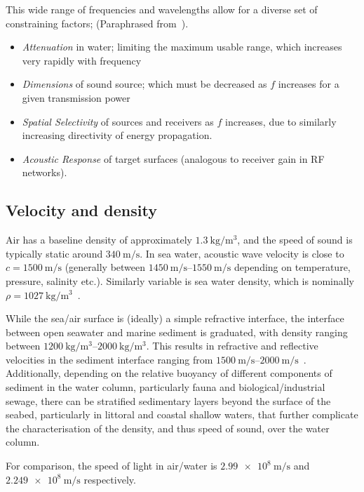 This wide range of frequencies and wavelengths allow for a diverse set of constraining factors; (Paraphrased from~\citet{lurton2010}).

\begin{itemize}
  \item \emph{Attenuation} in water; limiting the maximum usable range, which increases very rapidly with frequency
  \item \emph{Dimensions} of sound source; which must be decreased as $f$ increases for a given transmission power
  \item \emph{Spatial Selectivity} of sources and receivers as $f$ increases, due to similarly increasing directivity of energy propagation.
  \item \emph{Acoustic Response} of target surfaces (analogous to receiver gain in RF networks).
\end{itemize}

\subsection{Velocity and density}\label{sec:aco_vel}

Air has a baseline density of approximately $\SI{1.3}{\kilogram\per\meter\cubed}$, and the speed of sound is typically static around $\SI{340}{\meter\per\second}$.
In sea water, acoustic wave velocity is close to $c=\SI{1500}{\meter\per\second}$ (generally between $\SIrange{1450}{1550}{\meter\per\second}$ depending on temperature, pressure, salinity etc.).
Similarly variable is sea water density, which is nominally $\rho = \SI{1027}{\kilogram\per\meter\cubed}$~\cite{Wang2010}.

While the sea/air surface is (ideally) a simple refractive interface, the interface between open seawater and marine sediment is graduated, with density ranging between $\SIrange{1200}{2000}{\kilogram\per\meter\cubed}$. 
This results in refractive and reflective velocities in the sediment interface ranging from $\SIrange{1500}{2000}{\meter\per\second}$~\cite{lurton2010}.
Additionally, depending on the relative buoyancy of different components of sediment in the water column, particularly fauna and biological/industrial sewage, there can be stratified sedimentary layers beyond the surface of the seabed, particularly in littoral and coastal shallow waters, that further complicate the characterisation of the density, and thus speed of sound, over the water column.

For comparison, the speed of light in air/water is $\SI{2.99e8}{\meter\per\second}$ and $\SI{2.249e8}{\meter\per\second}$ respectively. 

